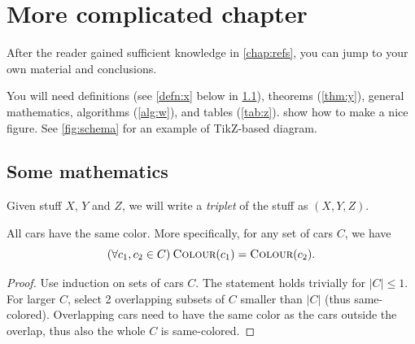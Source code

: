 \chapter{More complicated chapter}
\label{chap:math}

After the reader gained sufficient knowledge in \cref{chap:refs}, you can jump to your own material and conclusions.

You will need definitions (see \cref{defn:x} below in \cref{sec:demo}), theorems (\cref{thm:y}), general mathematics, algorithms (\cref{alg:w}), and tables (\cref{tab:z}).  show how to make a nice figure. See \cref{fig:schema} for an example of TikZ-based diagram.

\section{Some mathematics}
\label{sec:demo}

\begin{defn}[Triplet]\label{defn:x}
Given stuff $X$, $Y$ and $Z$, we will write a \emph{triplet} of the stuff as $(X,Y,Z)$.
\end{defn}

\newcommand{\Col}{\textsc{Colour}}

\begin{thm}\label{thm:y}
All cars have the same color. More specifically, for any set of cars $C$, we have
$$(\forall c_1, c_2 \in C)\:\Col(c_1) = \Col(c_2).$$
\end{thm}

\begin{proof}
Use induction on sets of cars $C$. The statement holds trivially for $|C|\leq1$. For larger $C$, select 2 overlapping subsets of $C$ smaller than $|C|$ (thus same-colored). Overlapping cars need to have the same color as the cars outside the overlap, thus also the whole $C$ is same-colored.
\end{proof}

